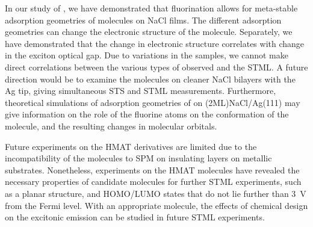 In our study of , we have demonstrated that fluorination allows for meta-stable adsorption geometries of molecules on NaCl films. The different adsorption geometries can change the electronic structure of the molecule. Separately, we have demonstrated that the change in electronic structure correlates with change in the exciton optical gap. Due to variations in the samples, we cannot make direct correlations between the various types of  observed and the \ac{STML}. A future direction would be to examine the molecules on cleaner NaCl bilayers with the Ag tip, giving simultaneous \ac{STS} and \ac{STML} measurements. Furthermore, theoretical simulations of adsorption geometries of  on (2ML)NaCl/Ag(111) may give information on the role of the fluorine atoms on the conformation of the molecule, and the resulting changes in molecular orbitals.

Future experiments on the HMAT derivatives are limited due to the incompatibility of the molecules to \ac{SPM} on insulating layers on metallic substrates. Nonetheless, experiments on the HMAT molecules have revealed the necessary properties of candidate molecules for further \ac{STML} experiments, such as a planar structure, and HOMO/LUMO states that do not lie further than \SI{3}{V} from the Fermi level. With an appropriate molecule, the effects of chemical design on the excitonic emission can be studied in future \ac{STML} experiments.





                                    